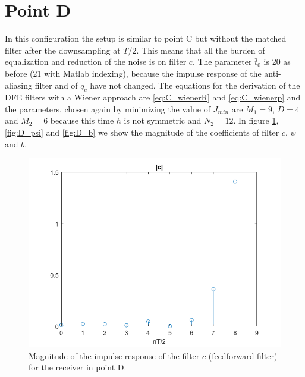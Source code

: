 \documentclass[a4paper,11.5pt]{article}
\begin{document}
\section*{Point D} 

In this configuration the setup is similar to point C but without the matched filter after the downsampling at $T/2$. This means that all the burden of equalization and reduction of the noise is on filter $c$. The parameter $\bar{t}_0$ is 20 as before (21 with Matlab indexing), because the impulse response of the anti-aliasing filter and of $q_c$ have not changed. The equations for the derivation of the DFE filters with a Wiener approach are \ref{eq:C_wienerR} and \ref{eq:C_wienerp} and the parameters, chosen again by minimizing the value of $J_{min}$ are $M_1=9$, $D=4$ and $M_2=6$ because this time $h$ is not symmetric and $N_2=12$. In figure \ref{fig:D_c}, \ref{fig:D_psi} and \ref{fig:D_b} we show the magnitude of the coefficients of filter $c$, $\psi$ and $b$.

\begin{figure}[H]
	\begin{center}   
		\includegraphics[width=\textwidth]{figs/D_c.png} 
		\caption{Magnitude of the impulse response of the filter $c$ (feedforward filter) for the receiver in point D.}
		\label{fig:D_c}
	\end{center}
\end{figure}
\end{document}
